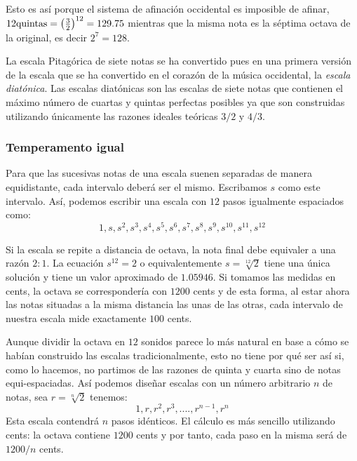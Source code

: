 \documentclass[11pt,a4paper]{article}
\begin{document}
	Esto es así porque el sistema de afinación occidental es imposible de afinar, $12 \hbox{quintas} = \left( \frac{3}{2} \right)^{12} = 129.75$ mientras que la misma nota es la séptima octava de la original, es decir $2^7 = 128 $.
		
		
	La escala Pitagórica de siete notas se ha convertido pues en una primera versión de la escala que se ha convertido en el corazón de la música occidental, la \emph{escala diatónica}. Las escalas diatónicas son las escalas de siete notas que contienen el máximo número de cuartas y quintas perfectas posibles ya que son construidas utilizando únicamente las razones ideales teóricas $3/2$ y $4/3$.
	
	\subsubsection{Temperamento igual}
	
	Para que las sucesivas notas de una escala suenen separadas de manera equidistante, cada intervalo deberá ser el mismo. Escribamos $s$ como este intervalo. Así, podemos escribir una escala con $12$ pasos igualmente espaciados como:
	$$
	1, s, s^2, s^3, s^4, s^5, s^6, s^7, s^8, s^9, s^{10}, s^{11}, s^{12}
	$$
	
	Si la escala se repite a distancia de octava, la nota final debe equivaler a una razón $2:1$. La ecuación $s^{12} = 2$ o equivalentemente $s = \sqrt[12]{2}$ tiene una única solución y tiene un valor aproximado de $1.05946$. Si tomamos las medidas en cents, la octava se correspondería con $1200$ cents y de esta forma, al estar ahora las notas situadas a la misma distancia las unas de las otras, cada intervalo de nuestra escala mide exactamente $100$ cents.
	
	Aunque dividir la octava en $12$ sonidos parece lo más natural en base a cómo se habían construido las escalas tradicionalmente, esto no tiene por qué ser así si, como lo hacemos, no partimos de las razones de quinta y cuarta sino de notas equi-espaciadas. Así podemos diseñar escalas con un número arbitrario $n$ de notas, sea $r = \sqrt[n]{2}$ tenemos:
	$$
	1, r, r^2, r^3, ....,r^{n-1}, r^{n}
	$$
	Esta escala contendrá $n$ pasos idénticos. El cálculo es más sencillo utilizando cents: la octava contiene $1200$ cents y por tanto, cada paso en la misma será de $1200/n$ cents.
	
\end{document}
